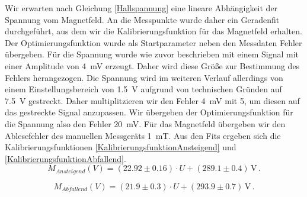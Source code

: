 \documentclass{scrartcl}
\begin{document}
Wir erwarten nach Gleichung \eqref{Hallspannung} eine lineare Abhängigkeit der Spannung vom Magnetfeld. An die Messpunkte wurde daher ein Geradenfit durchgeführt, aus dem wir die Kalibrierungsfunktion für das Magnetfeld erhalten. Der Optimierungsfunktion wurde als Startparameter neben den Messdaten Fehler übergeben. Für die Spannung wurde wie zuvor beschrieben mit einem Signal mit einer Amplitude von \SI{4}{mV} erzeugt. Daher wird diese Größe zur Bestimmung des Fehlers herangezogen. Die Spannung wird im weiteren Verlauf allerdings von einem Einstellungsbereich von \SI{1.5}{V} aufgrund von technischen Gründen auf \SI{7.5}{V} gestreckt. Daher multiplitzieren wir den Fehler \SI{4}{mV} mit 5, um diesen auf das gestreckte Signal anzupassen. Wir übergeben der Optimierungsfunktion für die Spannung also den Fehler \SI{20}{mV}.
Für das Magnetfeld übergeben wir den Ablesefehler des manuellen Messgeräts \SI{1}{mT}.
Aus den Fits ergeben sich die Kalibrierungsfunktionen \eqref{KalibrierungsfunktionAnsteigend} und \eqref{KalibrierungsfunktionAbfallend}. 
\begin{equation}
    M_{Ansteigend}(V) = (22.92 \pm 0.16)  \cdot U + (289.1 \pm 0.4) \, \mathrm{V} \, .
    \label{KalibrierungsfunktionAnsteigend}
\end{equation}

\begin{equation}
    M_{Abfallend}(V) = (21.9 \pm 0.3) \cdot U + (293.9 \pm 0.7) \, \mathrm{V} \, .
    \label{KalibrierungsfunktionAbfallend}
\end{equation}
\end{document}
